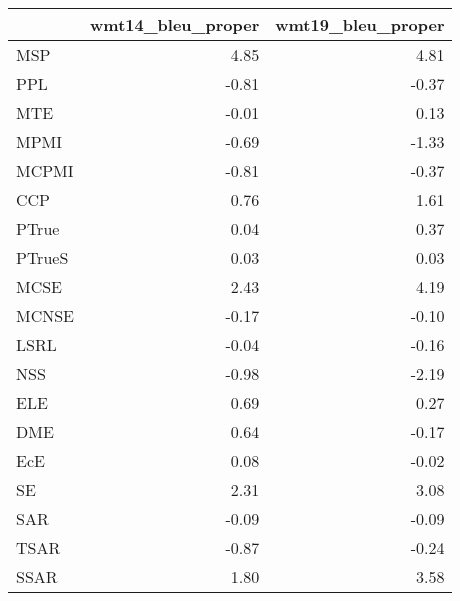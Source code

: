 \begin{tabular}{lrr}
\toprule
 & wmt14\_bleu\_proper & wmt19\_bleu\_proper \\
\midrule
MSP & 4.85 & 4.81 \\
PPL & -0.81 & -0.37 \\
MTE & -0.01 & 0.13 \\
MPMI & -0.69 & -1.33 \\
MCPMI & -0.81 & -0.37 \\
CCP & 0.76 & 1.61 \\
PTrue & 0.04 & 0.37 \\
PTrueS & 0.03 & 0.03 \\
MCSE & 2.43 & 4.19 \\
MCNSE & -0.17 & -0.10 \\
LSRL & -0.04 & -0.16 \\
NSS & -0.98 & -2.19 \\
ELE & 0.69 & 0.27 \\
DME & 0.64 & -0.17 \\
EcE & 0.08 & -0.02 \\
SE & 2.31 & 3.08 \\
SAR & -0.09 & -0.09 \\
TSAR & -0.87 & -0.24 \\
SSAR & 1.80 & 3.58 \\
\bottomrule
\end{tabular}
